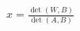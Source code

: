 \documentclass[preview]{standalone}
\begin{document}
\begin{align*}
x = \frac{\det(W, B)}{\det(A, B)}
\end{align*}
\end{document}

